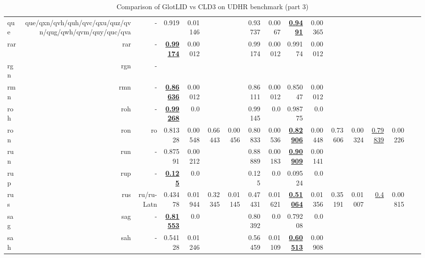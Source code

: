 \documentclass[11pt]{article}
\def\udhr{UDHR\xspace}
\begin{document}
\begin{table*}[h]
{\begin{tabular}{lrrrrrrrrrrrrrrrr}
que         & que/qxn/qvh/quh/qvc/qxu/quz/qvn/qug/qwh/qvm/quy/quc/qva         & -         & 0.919         & 0.01146         &          &          & 0.93737         & 0.0067         & \textbf{\underline{0.9491}}         & 0.00365         &          &          &          &          \\
rar         & rar         & -         & \textbf{\underline{0.99174}}         & 0.00012         &          &          & 0.99174         & 0.00012         & 0.99174         & 0.00012         &          &          &          &          \\
rgn         & rgn         & -         &          &          &          &          &          &          &          &          &          &          &          &          \\
rmn         & rmn         & -         & \textbf{\underline{0.86636}}         & 0.00012         &          &          & 0.86111         & 0.00012         & 0.85047         & 0.00012         &          &          &          &          \\
roh         & roh         & -         & \textbf{\underline{0.99268}}         & 0.0         &          &          & 0.99145         & 0.0         & 0.98775         & 0.0         &          &          &          &          \\
ron         & ron         & ro         & 0.81328         & 0.00548         & 0.66443         & 0.00456         & 0.80833         & 0.00536         & \textbf{\underline{0.82906}}         & 0.00448         & 0.73606         & 0.00324         & \underline{0.79839}         & 0.00226         \\
run         & run         & -         & 0.87591         & 0.00212         &          &          & 0.88889         & 0.00183         & \textbf{\underline{0.90909}}         & 0.00141         &          &          &          &          \\
rup         & rup         & -         & \textbf{\underline{0.125}}         & 0.0         &          &          & 0.125         & 0.0         & 0.09524         & 0.0         &          &          &          &          \\
rus         & rus         & ru/ru-Latn         & 0.43478         & 0.01944         & 0.32345         & 0.01145         & 0.47431         & 0.01621         & \textbf{\underline{0.51064}}         & 0.01356         & 0.35191         & 0.01007         & \underline{0.4}         & 0.00815         \\
sag         & sag         & -         & \textbf{\underline{0.81553}}         & 0.0         &          &          & 0.80392         & 0.0         & 0.79208         & 0.0         &          &          &          &          \\
sah         & sah         & -         & 0.54128         & 0.01246         &          &          & 0.56459         & 0.01109         & \textbf{\underline{0.60513}}         & 0.00908         &          &          &          &          \\
\end{tabular}
}
\caption{Comparison of GlotLID vs CLD3 on \udhr benchmark (part 3)}
\label{tab:appendix_glotlid_cld3_udhr_3}
\end{table*}
\end{document}
